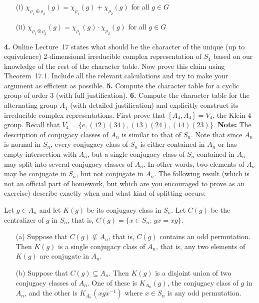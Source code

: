 \documentclass[12pt]{amsart}
\begin{document}
\begin{itemize}
\item[(i)] $\chi_{\rho_1\oplus \rho_2}(g)=\chi_{\rho_1}(g)+\chi_{\rho_2}(g)$ for all $g\in G$
\item[(ii)] $\chi_{\rho_1\otimes \rho_2}(g)=\chi_{\rho_1}(g)\cdot\chi_{\rho_2}(g)$ for all $g\in G$
\end{itemize}
\skv
{\bf 4.} Online Lecture~17 states what should be the character of the unique (up to equivalence) 2-dimensional irreducible complex representation of $S_4$ based on our knowledge of the rest of the character table. Now prove this claim using Theorem~17.1. Include all the relevant calculations and try to make your argument as efficient as possible.
\skv
{\bf 5.} Compute the character table for a cyclic group of order $3$ (with full justification). 
\skv
{\bf 6.} Compute the character table for the alternating group $A_4$ (with detailed justification) and explicitly construct its irreducible complex representations. First prove that $[A_4,A_4]=V_4$, the Klein $4$-group. Recall that
$V_4=\{e, (12)(34), (13)(24), (14)(23)\}$.
\skv
{\bf Note:} The description of conjugacy classes of $A_n$ is similar to that of $S_n$. Note that since $A_n$
is normal in $S_n$, every conjugacy class of $S_n$ is either contained in $A_n$ or has empty intersection with $A_n$,
but a single conjugacy class of $S_n$ contained in $A_n$ may split into several conjugacy classes of $A_n$. In other words, two elements of $A_n$ may be conjugate in $S_n$, but not conjugate in $A_n$. The following result (which is not an official part of homework, but which are you encouraged to prove as an exercise) describe exactly when and what kind of splitting occurs:
\skv

Let $g\in A_n$ and let $K(g)$ be its conjugacy class in $S_n$. Let $C(g)$ be the centralizer of $g$ in $S_n$, that is,
$C(g)=\{x\in S_n:\, gx=xg\}$.

\begin{itemize}
\item[(a)] Suppose that $C(g)\not\subseteq A_n$, that is, $C(g)$ contains an odd permutation. Then $K(g)$ is a single conjugacy class of $A_n$, that is, any two elements of $K(g)$ are conjugate in $A_n$.
\item[(b)] Suppose that $C(g)\subseteq A_n$. Then $K(g)$ is a disjoint union of two conjugacy classes of $A_n$. One
of these is $K_{A_n}(g)$, the conjugacy class of $g$ in $A_n$, and the other is $K_{A_n}(xgx^{-1})$ where $x\in S_n$
is any odd permutation.
\end{itemize}
\skv
\end{document}
